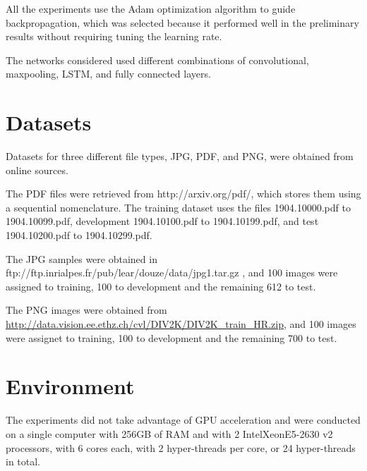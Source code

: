All the experiments use the Adam
optimization algorithm to guide backpropagation, which was selected because it performed well in the preliminary results without requiring tuning the learning rate.

The networks considered used different combinations of convolutional, maxpooling, LSTM, and fully connected layers.


\section{Datasets}

Datasets for three different file types, JPG, PDF, and PNG, were obtained from online sources.

The PDF files were retrieved from http://arxiv.org/pdf/, which stores them using a sequential nomenclature. The training dataset uses the files 1904.10000.pdf to 1904.10099.pdf, development 1904.10100.pdf to 1904.10199.pdf, and test 1904.10200.pdf to 1904.10299.pdf. 

The JPG samples were obtained in ftp://ftp.inrialpes.fr/pub/lear/douze/data/jpg1.tar.gz , and 100 images were assigned to training, 100 to development and the remaining 612 to test.

The PNG images were obtained from \url{http://data.vision.ee.ethz.ch/cvl/DIV2K/DIV2K_train_HR.zip}, and 100 images were assignet to training, 100 to development and the remaining 700 to test.


\section{Environment}
The experiments did not take advantage of GPU acceleration and were  conducted on a single computer with 256GB of RAM and with 2 Intel\textregistered Xeon\textregistered E5-2630 v2 processors, with 6 cores each, with 2 hyper-threads per core, or 24 hyper-threads in total. 

